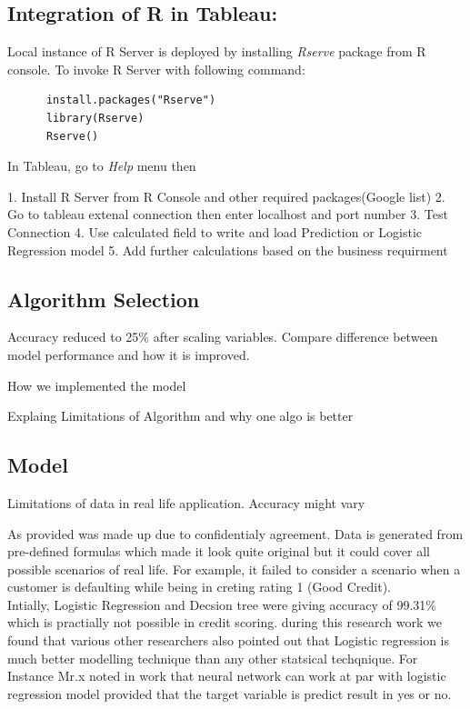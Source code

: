 \subsection{Integration of R in Tableau:} 

Local instance of R Server is deployed by installing \emph{Rserve} package from R console. To invoke R Server with following command:
      \begin{verbatim}
      install.packages("Rserve")
      library(Rserve)
      Rserve()
      \end{verbatim}

   In Tableau, go to \emph{Help} menu then 

1. Install R Server from R Console and other required packages(Google list)
2. Go to tableau extenal connection then enter localhost and port number
3. Test Connection
4. Use calculated field to write and load Prediction or Logistic Regression model
5. Add further calculations based on the business requirment


\subsection{Algorithm Selection}
Accuracy reduced to 25\% after scaling variables. Compare difference between model performance and how it is improved.

How we implemented the model

Explaing Limitations of Algorithm and why one algo is better

\subsection{Model}

Limitations of data in real life application. Accuracy might vary

As provided was made up due to confidentialy agreement. Data is generated from pre-defined formulas which made it look quite original but it could cover all possible scenarios of real life. For example, it failed to consider a scenario when a customer is defaulting while being in creting rating 1 (Good Credit). \\

Intially, Logistic Regression and Decsion tree were giving accuracy of 99.31\% which is practially not possible in credit scoring. during this research work we found that various other researchers also pointed out that Logistic regression is much better modelling technique than any other statsical techqnique. For Instance Mr.x noted in work that neural network can work at par with logistic regression model provided that the target variable is predict result in yes or no.\\

